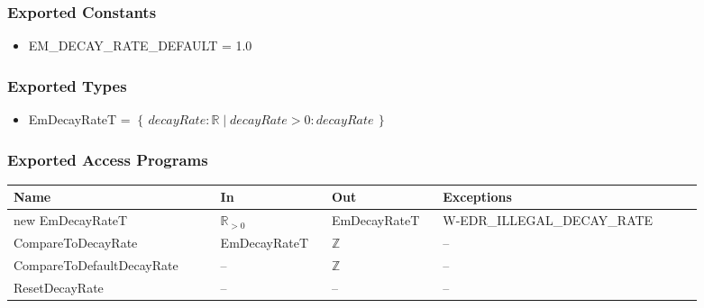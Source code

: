 \subsubsection{Exported Constants}
\begin{itemize}

    \item EM\_DECAY\_RATE\_DEFAULT = 1.0

\end{itemize}

\subsubsection{Exported Types}
\begin{itemize}

    \item EmDecayRateT = $\left\{ \, \mathit{decayRate} : \mathbb{R} \; | \;
    \mathit{decayRate} > 0 : \mathit{decayRate} \, \right\}$

\end{itemize}

\subsubsection{Exported Access Programs}
\begin{center}
    \renewcommand{\arraystretch}{1.2}
    \small
    \begin{tabular}{m{0.27\linewidth} m{0.14\linewidth} m{0.14\linewidth}
            m{0.34\linewidth}}
        \toprule
        \textbf{Name} & \textbf{In} & \textbf{Out} & \textbf{Exceptions} \\
        \midrule

        \rowcolor[gray]{0.9}new EmDecayRateT & $ \mathbb{R}_{>0} $ &
        EmDecayRateT & W-EDR\_ILLEGAL\_DECAY\_RATE \\

        CompareToDecayRate & EmDecayRateT & $\mathbb{Z}$ & -- \\

        \rowcolor[gray]{0.9}CompareToDefaultDecayRate & -- & $\mathbb{Z}$ & --
        \\

        ResetDecayRate & -- & -- & -- \\

        \bottomrule
    \end{tabular}
\end{center}

